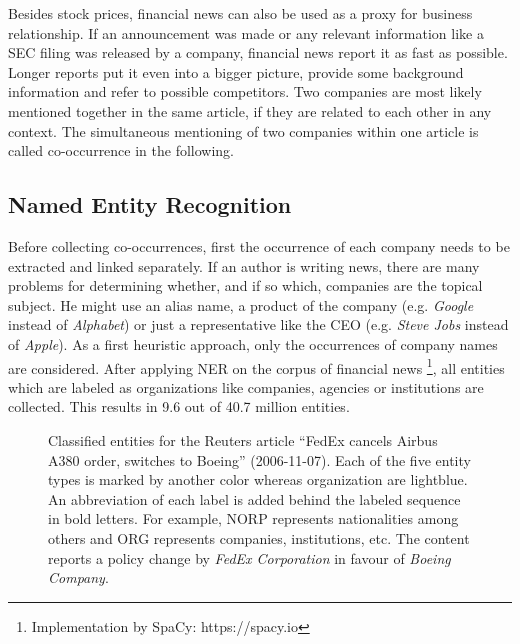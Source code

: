 Besides stock prices, financial news can also be used as a proxy for business relationship. If an announcement was made or any relevant information like a SEC filing was released by a company, financial news report it as fast as possible. Longer reports put it even into a bigger picture, provide some background information and refer to possible competitors. Two companies are most likely mentioned together in the same article, if they are related to each other in any context. The simultaneous mentioning of two companies within one article is called co-occurrence in the following.

\subsection{Named Entity Recognition}

Before collecting co-occurrences, first the occurrence of each company needs to be extracted and linked separately. If an author is writing news, there are many problems for determining whether, and if so which, companies are the topical subject. He might use an alias name, a product of the company (e.g. \emph{Google} instead of \emph{Alphabet}) or just a representative like the CEO (e.g. \emph{Steve Jobs} instead of \emph{Apple}). As a first heuristic approach, only the occurrences of company names are considered. After applying NER on the corpus of financial news \footnote{Implementation by SpaCy: https://spacy.io}, all entities which are labeled as organizations like companies, agencies or institutions are collected. This results in 9.6 out of 40.7 million entities.



\begin{figure}
    \centering
    \caption{Classified entities for the Reuters article \enquote{FedEx cancels Airbus A380 order, switches to Boeing} (2006-11-07). Each of the five entity types is marked by another color whereas organization are lightblue. An abbreviation of each label is added behind the labeled sequence in bold letters. For example, NORP represents nationalities among others and ORG represents companies, institutions, etc. The content reports a policy change by \emph{FedEx Corporation} in favour of \emph{Boeing Company}.} 
    \label{fig:ner-entities}
\end{figure}

